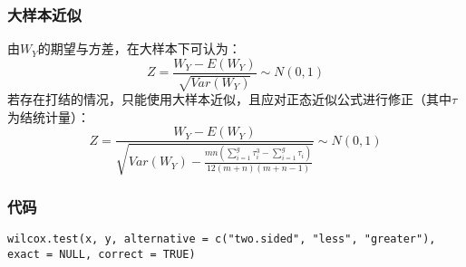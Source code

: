\subsubsection{大样本近似}
由$W_Y$的期望与方差，在大样本下可认为：
\begin{equation}
	Z=\frac{W_Y-E(W_Y)}{\sqrt{Var(W_Y)}}\sim N(0,1)
\end{equation}
若存在打结的情况，只能使用大样本近似，且应对正态近似公式进行修正（其中$\tau$为结统计量）：
\begin{equation}
	Z=\frac{W_Y-E(W_Y)}{\sqrt{Var(W_Y)-\frac{mn(\sum_{i=1}^g\tau_i^3-\sum_{i=1}^g\tau_i)}{12(m+n)(m+n-1)}}}\sim N(0,1)
\end{equation}
\subsubsection{代码}
\begin{verbatim}
wilcox.test(x, y, alternative = c("two.sided", "less", "greater"), exact = NULL, correct = TRUE)
\end{verbatim}